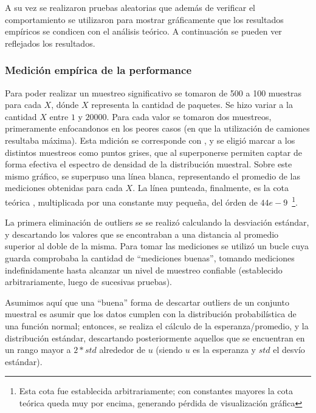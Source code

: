 \documentclass[11pt, a4paper, twoside]{article}
\begin{document}
A su vez se realizaron pruebas aleatorias que además de verificar el
comportamiento se utilizaron para mostrar gráficamente que los resultados
empíricos se condicen con el análisis teórico. A continuación se pueden
ver reflejados los resultados.

\subsubsection{Medición empírica de la performance}

Para poder realizar un muestreo significativo se tomaron de 500 a 100 muestras para cada $X$,
dónde $X$ representa la cantidad de paquetes. Se hizo variar a la cantidad $X$ entre $1$ 
y $20000$. Para cada valor se tomaron dos muestreos, primeramente enfocandonos en los peores 
casos (en que la utilización de camiones resultaba máxima). Esta mdición se corresponde con 
, y se eligió marcar a los distintos muestreos como puntos grises, que 
al superponerse permiten captar de forma efectiva el espectro de densidad de la distribución 
muestral. Sobre este mismo gráfico, se superpuso una línea blanca, representando el promedio 
de las mediciones obtenidas para cada $X$. La línea punteada, finalmente, es la cota teórica 
, multiplicada por una constante muy pequeña, del órden de 
$44e-9$~\footnote{Esta cota fue establecida arbitrariamente; con constantes mayores la 
cota teórica queda muy por encima, generando pérdida de visualización gráfica}.

La primera eliminación de outliers se se realizó calculando la desviación estándar, 
y descartando los valores que se encontraban a una distancia al promedio superior 
al doble de la misma. Para tomar las mediciones se utilizó un bucle cuya guarda
comprobaba la cantidad de \enquote{mediciones buenas}, tomando mediciones indefinidamente
hasta alcanzar un nivel de muestreo confiable (establecido arbitrariamente, luego
de sucesivas pruebas).

Asumimos aquí que una \enquote{buena} forma de descartar outliers de un conjunto 
muestral es asumir que los datos cumplen con la distribución probabilística de
una función normal; entonces, se realiza el cálculo de la esperanza/promedio, y 
la distribución estándar, descartando posteriormente aquellos que se encuentran
en un rango mayor a $2*std$ alrededor de $u$
(siendo $u$ es la esperanza y $std$ el desvío estándar).
\end{document}
